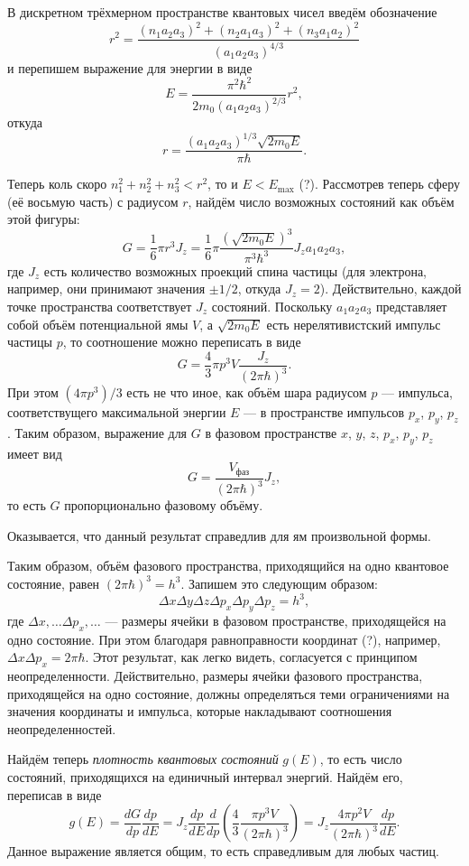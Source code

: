 В дискретном трёхмерном пространстве квантовых чисел введём обозначение  
\[
  r^2 = \frac{(n_1a_2a_3)^2 + (n_2a_1a_3)^2 + (n_3a_1a_2)^2}{(a_1a_2a_3)^{4/3}}
\]
и перепишем выражение для энергии в виде 
\[
  E = \frac{\pi^2\hbar^2}{2m_0(a_1a_2a_3)^{2/3}}r^2,
\]
откуда 
\[
  r = \frac{(a_1a_2a_3)^{1/3}\sqrt{2m_0E}}{\pi\hbar}.
\]

Теперь коль скоро $ n_1^2 + n_2^2 + n_3^2 < r^2 $, то и $ E < E_{\max} $ (?). Рассмотрев теперь сферу (её восьмую часть) с радиусом $ r $, найдём число
возможных состояний как объём этой фигуры:
\[
  G = \frac{1}{6}\pi r^3 J_z = \frac{1}{6} \pi \frac{ \left( \sqrt{2m_0E}
  \right)^3 }{\pi^3\hbar^3}J_z a_1a_2a_3,
\]
где $ J_z $ есть количество возможных проекций спина частицы (для электрона,
например, они принимают значения $ \pm 1/2 $, откуда $ J_z = 2 $).
Действительно, каждой точке пространства соответствует $ J_z $ состояний.
Поскольку $ a_1a_2a_3 $ представляет собой объём потенциальной ямы $ V $, а $
\sqrt{2m_0E} $ есть нерелятивистский импульс частицы $ p $, то соотношение можно
переписать в виде 
\[
  G = \frac{4}{3} \pi p^3 V \frac{J_z}{(2\pi\hbar)^3}.
\]
При этом $ (4\pi p^3)/3 $ есть не что иное, как объём шара радиусом $ p $
--- импульса, соответствущего максимальной энергии $ E $ --- в пространстве
импульсов $ p_x $, $ p_y $, $ p_z $. Таким образом, выражение для $ G $ в
фазовом пространстве $ x $, $ y $, $ z $, $ p_x $, $ p_y $, $ p_z $ имеет вид 
\[
  G = \frac{V_{\text{фаз}}}{(2\pi \hbar)^3} J_z,
\]
то есть $ G $ пропорционально фазовому объёму.

Оказывается, что данный результат справедлив для ям произвольной формы.

Таким образом, объём фазового пространства, приходящийся на одно квантовое
состояние, равен $ (2\pi\hbar)^3 = h^3 $. Запишем это следующим образом: 
\[
  \Delta x \Delta y \Delta z \Delta p_x \Delta p_y \Delta p_z = h^3,
\]
где $ \Delta x, \ldots \Delta p_x, \ldots $ --- размеры ячейки в фазовом пространстве, приходящейся
на одно состояние. При этом благодаря равноправности координат (?), например, $
\Delta x \Delta
p_x = 2\pi \hbar$. Этот результат, как легко видеть, согласуется с принципом 
неопределенности. Действительно, размеры ячейки фазового 
пространства, приходящейся на одно состояние, должны определяться
теми ограничениями на значения координаты и импульса, которые
накладывают соотношения неопределенностей.

Найдём теперь \emph{плотность квантовых состояний} $ g(E) $, то есть число
состояний, приходящихся на единичный интервал энергий. Найдём его, переписав в
виде 
\[
  g(E)  = \frac{dG}{dp} \frac{dp}{dE} = J_z \frac{dp}{dE} \frac{d}{dp} \left(
  \frac{4}{3} \frac{\pi p^3 V}{(2\pi \hbar)^3}\right) = J_z \frac{4\pi p^2
  V}{(2\pi\hbar)^3} \frac{dp}{dE}.
\]
Данное выражение является общим, то есть справедливым для любых частиц.

